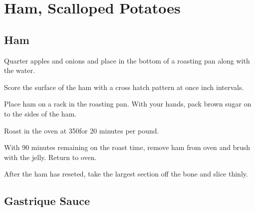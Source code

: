 
\section{Ham, Scalloped Potatoes}
\begin{recipe}


\subsection{Ham}



Quarter apples and onions and place in the bottom of a roasting pan along with the water.

Score the surface of the ham with a cross hatch pattern at once inch intervals.

Place ham on a rack in the roasting pan. With your hands, pack brown sugar on to the sides of the ham.

Roast in the oven at 350\degree for 20 minutes per pound.


With 90 minutes remaining on the roast time, remove ham from oven and brush with the jelly. Return to oven.

After the ham has reseted, take the largest section off the bone and slice thinly.

\columnbreak
\subsection{Gastrique Sauce}



\end{recipe}
